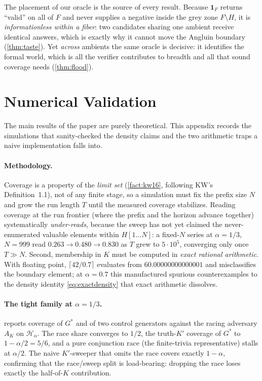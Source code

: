 \documentclass[11pt]{article}
\numberwithin{equation}{section}
\newcommand{\mc}[1]{\mathcal{#1}}
\newcommand{\Amb}{F}
\newcommand{\Val}{H}
\newcommand{\Hcal}{\mc{H}}
\newcommand{\Hfam}{\Hcal_{\alpha}}
\newcommand{\rest}[2]{#1[1\!\dots\! #2]}
\theoremstyle{plain}
\theoremstyle{definition}
\theoremstyle{remark}
\begin{document}
\renewcommand{\arraystretch}{1}

The placement of our oracle is the source of every result. Because $\mathbf 1_{\Amb}$ returns
``valid'' on all of $\Amb$ and never supplies a negative inside the grey zone $\Amb \setminus
\Val$, it is \emph{informationless within a fiber}: two candidates sharing one ambient receive
identical answers, which is exactly why it cannot move the Angluin boundary
(\cref{thm:taste}). Yet \emph{across} ambients the same oracle is decisive: it identifies the
formal world, which is all the verifier contributes to breadth and all that sound coverage
needs (\cref{thm:flood}).

\section{Numerical Validation}
\label{app:numerics}

The main results of the paper are purely theoretical. This appendix records the simulations
that sanity-checked the density claims and the two arithmetic traps a naive implementation
falls into.

\paragraph{Methodology.}
Coverage is a property of the \emph{limit set} (\cref{fact:kw16}, following KW's
Definition~1.1), not of any finite stage, so a simulation must fix the prefix size $N$ and
grow the run length $T$ until the measured coverage stabilizes. Reading coverage at the run
frontier (where the prefix and the horizon advance together) systematically
\emph{under-reads}, because the sweep has not yet claimed the never-enumerated valuable
elements within $\rest{\Val}{N}$: a fixed-$N$ series at $\alpha = 1/3$, $N = 999$ read $0.263
\to 0.480 \to 0.830$ as $T$ grew to $5 \cdot 10^5$, converging only once $T \gg N$. Second,
membership in $K$ must be computed in \emph{exact rational arithmetic}. With floating point,
$\lceil 42/0.7 \rceil$ evaluates from $60.00000000000001$ and misclassifies the boundary
element; at $\alpha = 0.7$ this manufactured spurious counterexamples to the density identity
\eqref{eq:exactdensity} that exact arithmetic dissolves.

\paragraph{The tight family at $\alpha = 1/3$.}
 reports coverage of $G^*$ and of two control generators against the
racing adversary $A_K$ on $\Hfam$. The race share converges to $1/2$, the truth-$K'$ coverage
of $G^*$ to $1 - \alpha/2 = 5/6$, and a pure conjunction race (the finite-trivia
representative) stalls at $\alpha/2$. The naive $K'$-sweeper that omits the race covers
exactly $1 - \alpha$, confirming that the race/sweep split is load-bearing: dropping the race
loses exactly the half-of-$K$ contribution.
\end{document}
